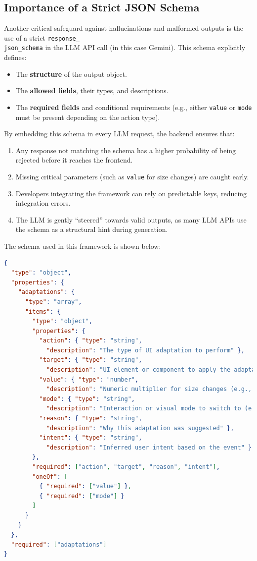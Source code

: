 \documentclass[openany]{book}
\begin{document}
\subsection{Importance of a Strict JSON Schema}
Another critical safeguard against hallucinations and malformed outputs is the use of a strict \texttt{response\_\\json\_schema} in the LLM API call (in this case Gemini). This schema explicitly defines:
\begin{itemize}
    \item The \textbf{structure} of the output object.
    \item The \textbf{allowed fields}, their types, and descriptions.
    \item The \textbf{required fields} and conditional requirements (e.g., either \texttt{value} or \texttt{mode} must be present depending on the action type).
\end{itemize}

By embedding this schema in every LLM request, the backend ensures that:
\begin{enumerate}
    \item Any response not matching the schema has a higher probability of being rejected before it reaches the frontend.
    \item Missing critical parameters (such as \texttt{value} for size changes) are caught early.
    \item Developers integrating the framework can rely on predictable keys, reducing integration errors.
    \item The LLM is gently “steered” towards valid outputs, as many LLM APIs use the schema as a structural hint during generation.
\end{enumerate}

The schema used in this framework is shown below:

\begin{lstlisting}[language=json,caption={SIF LLM Output JSON Schema}]
{
  "type": "object",
  "properties": {
    "adaptations": {
      "type": "array",
      "items": {
        "type": "object",
        "properties": {
          "action": { "type": "string",
            "description": "The type of UI adaptation to perform" },
          "target": { "type": "string",
            "description": "UI element or component to apply the adaptation to, 'all' is allowed" },
          "value": { "type": "number",
            "description": "Numeric multiplier for size changes (e.g., 1.5 for 50% larger)" },
          "mode": { "type": "string",
            "description": "Interaction or visual mode to switch to (e.g., 'voice')" },
          "reason": { "type": "string",
            "description": "Why this adaptation was suggested" },
          "intent": { "type": "string",
            "description": "Inferred user intent based on the event" }
        },
        "required": ["action", "target", "reason", "intent"],
        "oneOf": [
          { "required": ["value"] },
          { "required": ["mode"] }
        ]
      }
    }
  },
  "required": ["adaptations"]
}
\end{lstlisting}
\end{document}
